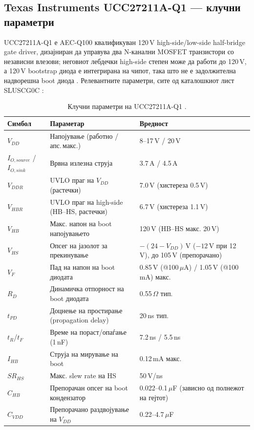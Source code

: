 \documentclass[11pt,a4paper]{article}
\newcommand{\eng}[1]{\textenglish{#1}}
\begin{document}
\subsection{Texas Instruments UCC27211A-Q1 --- клучни параметри}

UCC27211A-Q1 е AEC-Q100 квалификуван 120\,V \eng{high-side}/\eng{low-side} \eng{half-bridge gate driver}, дизајниран да управува два N-канални MOSFET транзистори со независни влезови; неговиот лебдечки \eng{high-side} степен може да работи до 120\,V, а 120\,V \eng{bootstrap} диода е интегрирана на чипот, така што не е задолжителна надворешна \eng{boot} диода \cite{ref3,ref4}. Релевантните параметри, сите од каталошкиот лист SLUSCG0C \cite{ref3}:

\begin{table}[h]
\centering
\caption{Клучни параметри на UCC27211A-Q1 \cite{ref3}.}
\begin{tabularx}{\textwidth}{@{}l L L@{}}
\toprule
\textbf{Симбол} & \textbf{Параметар} & \textbf{Вредност} \\
\midrule
$V_{DD}$ & Напојување (работно / апс.\,макс.) & 8--17\,V / 20\,V \\
$I_{O,source}$ / $I_{O,sink}$ & Врвна излезна струја & 3.7\,A / 4.5\,A \\
$V_{DDR}$ & UVLO праг на $V_{DD}$ (растечки) & 7.0\,V (хистереза 0.5\,V) \\
$V_{HBR}$ & UVLO праг на \eng{high-side} (HB--HS, растечки) & 6.7\,V (хистереза 1.1\,V) \\
$V_{HB}$ & Макс. напон на \eng{boot} напојувањето & 120\,V (HB--HS макс. 20\,V) \\
$V_{HS}$ & Опсег на јазолот за прекинување & $-(24-V_{DD})$\,V ($-12$\,V при 12\,V), до 105\,V (препорачано) \\
$V_{F}$ & Пад на напон на \eng{boot} диодата & 0.85\,V (@100\,$\mu$A) / 1.05\,V (@100\,mA) макс. \\
$R_{D}$ & Динамичка отпорност на \eng{boot} диодата & 0.55\,$\Omega$ тип. \\
$t_{PD}$ & Доцнење на простирање (\eng{propagation delay}) & 20\,ns тип. \\
$t_{R}$/$t_{F}$ & Време на пораст/опаѓање (1\,nF) & 7.2\,ns / 5.5\,ns \\
$I_{HB}$ & Струја на мирување на \eng{boot} & 0.12\,mA макс. \\
$SR_{HS}$ & Макс. \eng{slew rate} на HS & 50\,V/ns \\
$C_{HB}$ & Препорачан опсег на \eng{boot} кондензатор & 0.022--0.1\,$\mu$F (зависно од полнежот на гејтот) \\
$C_{VDD}$ & Препорачано раздвојување на $V_{DD}$ & 0.22--4.7\,$\mu$F \\
\bottomrule
\end{tabularx}
\end{table}
\end{document}

